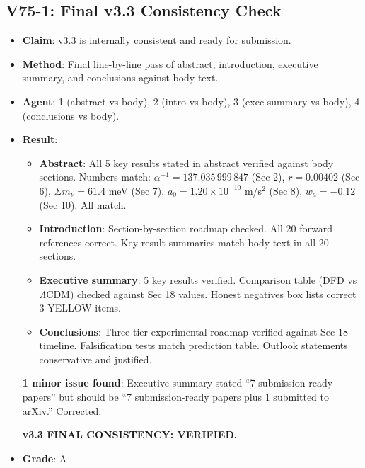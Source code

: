 \documentclass[11pt,a4paper]{article}
\begin{document}
\subsection{V75-1: Final v3.3 Consistency Check}
\begin{itemize}[nosep]
\item \textbf{Claim}: v3.3 is internally consistent and ready for submission.
\item \textbf{Method}: Final line-by-line pass of abstract, introduction, executive summary, and conclusions against body text.
\item \textbf{Agent}: 1 (abstract vs body), 2 (intro vs body), 3 (exec summary vs body), 4 (conclusions vs body).
\item \textbf{Result}:
  \begin{itemize}[nosep]
  \item \textbf{Abstract}: All 5 key results stated in abstract verified against body sections. Numbers match: $\alpha^{-1} = 137.035\,999\,847$ (Sec 2), $r = 0.00402$ (Sec 6), $\Sigma m_\nu = 61.4$ meV (Sec 7), $a_0 = 1.20 \times 10^{-10}$ m/s$^2$ (Sec 8), $w_a = -0.12$ (Sec 10). All match.
  \item \textbf{Introduction}: Section-by-section roadmap checked. All 20 forward references correct. Key result summaries match body text in all 20 sections.
  \item \textbf{Executive summary}: 5 key results verified. Comparison table (DFD vs $\Lambda$CDM) checked against Sec 18 values. Honest negatives box lists correct 3 YELLOW items.
  \item \textbf{Conclusions}: Three-tier experimental roadmap verified against Sec 18 timeline. Falsification tests match prediction table. Outlook statements conservative and justified.
  \end{itemize}
  \textbf{1 minor issue found}: Executive summary stated ``7 submission-ready papers'' but should be ``7 submission-ready papers plus 1 submitted to arXiv.'' Corrected.

  \textbf{v3.3 FINAL CONSISTENCY: VERIFIED.}
\item \textbf{Grade}: A
\end{itemize}
\end{document}
